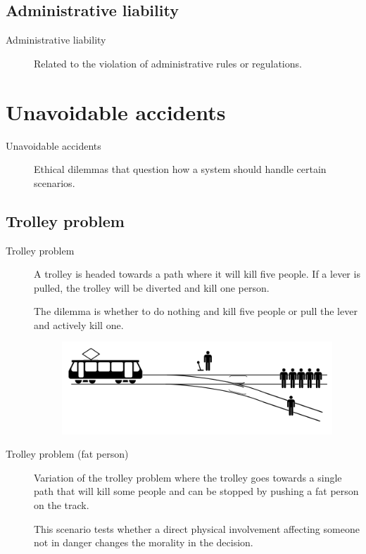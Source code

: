 \subsection{Administrative liability}

\begin{description}
    \item[Administrative liability] 
        Related to the violation of administrative rules or regulations.
\end{description}



\section{Unavoidable accidents}

\begin{description}
    \item[Unavoidable accidents]
        Ethical dilemmas that question how a system should handle certain scenarios.
\end{description}


\subsection{Trolley problem}

\begin{description}
    \item[Trolley problem] 
        A trolley is headed towards a path where it will kill five people. If a lever is pulled, the trolley will be diverted and kill one person.

        The dilemma is whether to do nothing and kill five people or pull the lever and actively kill one.

        \begin{figure}[H]
            \centering
            \includegraphics[width=0.5\linewidth]{./img/trolley_problem.png}
        \end{figure}

    \item[Trolley problem (fat person)] 
        Variation of the trolley problem where the trolley goes towards a single path that will kill some people and can be stopped by pushing a fat person on the track.

        This scenario tests whether a direct physical involvement affecting someone not in danger changes the morality in the decision.
\end{description}


